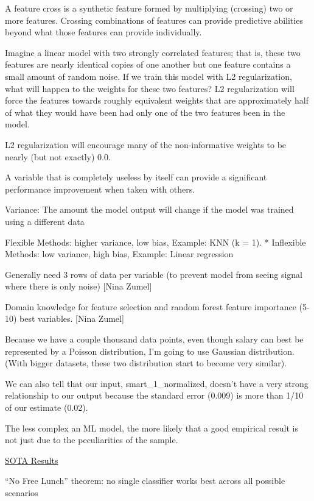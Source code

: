 \documentclass[]{book}
\begin{document}
A feature cross is a synthetic feature formed by multiplying (crossing) two or more features. Crossing combinations of features can provide predictive abilities beyond what those features can provide individually.

Imagine a linear model with two strongly correlated features; that is, these two features are nearly identical copies of one another but one feature contains a small amount of random noise. If we train this model with L2 regularization, what will happen to the weights for these two features? L2 regularization will force the features towards roughly equivalent weights that are approximately half of what they would have been had only one of the two features been in the model.

L2 regularization will encourage many of the non-informative weights to be nearly (but not exactly) 0.0.

A variable that is completely useless by itself can provide a significant performance improvement when taken with others.

Variance: The amount the model output will change if the model was trained using a different data

Flexible Methods: higher variance, low bias, Example: KNN (k = 1). * Inflexible Methods: low variance, high bias, Example: Linear regression

Generally need 3 rows of data per variable (to prevent model from seeing signal where there is only noise) {[}Nina Zumel{]}

Domain knowledge for feature selection and random forest feature importance (5-10) best variables. {[}Nina Zumel{]}

Because we have a couple thousand data points, even though salary can best be represented by a Poisson distribution, I'm going to use Gaussian distribution. (With bigger datasets, these two distribution start to become very similar).

We can also tell that our input, smart\_1\_normalized, doesn't have a very strong relationship to our output because the standard error (0.009) is more than 1/10 of our estimate (0.02).

The less complex an ML model, the more likely that a good empirical result is not just due to the peculiarities of the sample.

\href{https://paperswithcode.com/sota}{SOTA Results}

``No Free Lunch'' theorem: no single classifier works best across all possible scenarios
\end{document}
